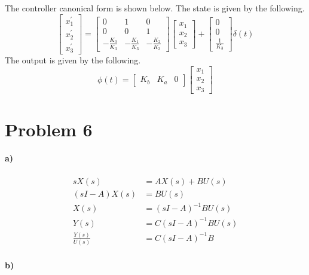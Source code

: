 \documentclass[12pt]{article}
\begin{document}
The controller canonical form is shown below. The state is given by the following.
\[\begin{bmatrix}
    x_1^\prime\\
    x_2^\prime\\
    x_3^\prime
\end{bmatrix}=\begin{bmatrix}
    0 & 1 & 0\\
    0 & 0 & 1\\
    -\frac{K_0}{K_3} & -\frac{K_1}{K_3} & -\frac{K_2}{K_3}
\end{bmatrix}\begin{bmatrix}
    x_1\\
    x_2\\
    x_3
\end{bmatrix} + \begin{bmatrix}
    0\\
    0\\
    \frac{1}{K_3}
\end{bmatrix}\delta(t)
\]
The output is given by the following.
\[\phi(t) = \begin{bmatrix} K_b & K_a & 0\end{bmatrix}\begin{bmatrix}
    x_1\\
    x_2\\
    x_3
\end{bmatrix}\]

\section*{Problem 6}

\paragraph{a)}

\begin{align*}
    sX(s)&=AX(s)+BU(s)\\
    (sI-A)X(s)&=BU(s)\\
    X(s)&=(sI-A)^{-1}BU(s)\\
    Y(s)&=C(sI-A)^{-1}BU(s)\\
    \frac{Y(s)}{U(s)}&=C(sI-A)^{-1}B
\end{align*}

\paragraph{b)}
\end{document}
